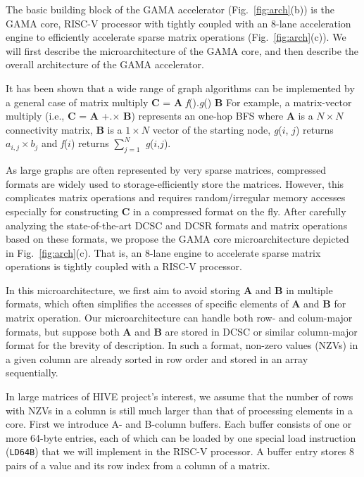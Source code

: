 \noindent
The basic building block of the GAMA accelerator (Fig.~\ref{fig:arch}(b)) is the GAMA core, 
RISC-V processor with tightly coupled with an 8-lane acceleration engine to efficiently accelerate sparse matrix operations (Fig.~\ref{fig:arch}(c)).
We will first describe the microarchitecture of the GAMA core, and then describe the overall architecture of the GAMA accelerator.


It has been shown that a wide range of graph algorithms can be implemented by a general case of matrix multiply \textbf{C} = \textbf{A} \textit{f}().\textit{g}() \textbf{B} 
For example, a matrix-vector multiply (i.e., \textbf{C} = \textbf{A} +.$\times$ \textbf{B}) represents an one-hop BFS 
where \textbf{A} is a $N \times N$ connectivity matrix, \textbf{B} is a $1 \times N$ vector of the starting node, 
\textit{g}($i$, $j$) returns $a_{i,j} \times b_{j}$ and \textit{f}($i$) returns $\sum_{j=1}^{N}$ \textit{g}($i$,$j$).


As large graphs are often represented by very sparse matrices, compressed formats are widely used to storage-efficiently store the matrices.
However, this complicates matrix operations and requires random/irregular memory accesses especially for constructing \textbf{C} in a compressed format on the fly.
After carefully analyzing the state-of-the-art DCSC and DCSR formats and matrix operations based on these formats, 
we propose the GAMA core microarchitecture depicted in Fig.~\ref{fig:arch}(c).
That is, an 8-lane engine to accelerate sparse matrix operations is tightly coupled with a RISC-V processor. 


In this microarchitecture, we first aim to avoid storing \textbf{A} and \textbf{B} in multiple formats, which often simplifies the accesses of specific elements of \textbf{A} and \textbf{B} for matrix operation.
Our microarchitecture can handle both row- and colum-major formats, but suppose both \textbf{A} and \textbf{B} are stored in DCSC or similar column-major format for the brevity of description.
In such a format, non-zero values (NZVs) in a given column are already sorted in row order and stored in an array sequentially. 


In large matrices of HIVE project's interest, we assume that the number of rows with NZVs in a column is still much larger than that of processing elements in a core.
First we introduce  A- and B-column buffers. 
Each buffer consists of one or more 64-byte entries, each of which can be loaded by one special load instruction (\texttt{LD64B}) that we will implement in the RISC-V processor. 
A buffer entry stores 8 pairs of a value and its row index from a column of a matrix. 


